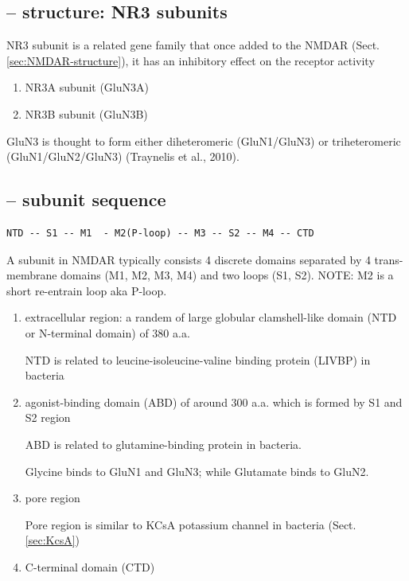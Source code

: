 \subsection{-- structure: NR3 subunits}
\label{sec:NR3-NMDAR}

NR3 subunit is a related gene family that once added to the NMDAR
(Sect.\ref{sec:NMDAR-structure}), it has an inhibitory effect on the receptor
activity
 \begin{enumerate}
     \item NR3A subunit (GluN3A)
     \item NR3B subunit (GluN3B)
\end{enumerate}

GluN3 is thought to form either diheteromeric (GluN1/GluN3) or triheteromeric
(GluN1/GluN2/GluN3) (Traynelis et al., 2010). 


\subsection{-- subunit sequence}

\begin{verbatim}
NTD -- S1 -- M1  - M2(P-loop) -- M3 -- S2 -- M4 -- CTD
\end{verbatim}

A subunit in NMDAR typically consists 4 discrete domains separated by 4
trans-membrane domains (M1, M2, M3, M4) and two loops (S1, S2). NOTE: M2 is a
short re-entrain loop aka P-loop.
\begin{enumerate}
  \item extracellular region: a randem of large globular clamshell-like domain
  (NTD or N-terminal domain) of 380 a.a.
  
  NTD is related to leucine-isoleucine-valine binding protein (LIVBP) in
  bacteria
  
  \item agonist-binding domain (ABD) of around 300 a.a. which is formed by S1
  and S2 region
  
  ABD is related to glutamine-binding protein in
  bacteria.
  
  Glycine binds to GluN1 and GluN3; while Glutamate binds to GluN2.
  
  \item pore region 
  
  Pore region is similar to KCsA potassium channel in bacteria
  (Sect.\ref{sec:KcsA})
  
  \item C-terminal domain (CTD)
\end{enumerate}

